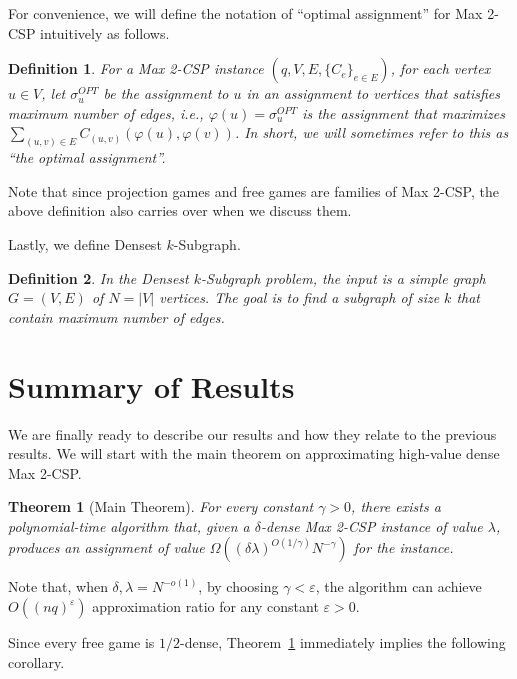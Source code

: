 \documentclass{article}
\newtheorem{theorem}{Theorem}
\newtheorem{definition}{Definition}
\begin{document}
For convenience, we will define the notation of ``optimal assignment'' for {\sc Max 2-CSP} intuitively as follows. \\

\begin{definition}
For a {\sc Max 2-CSP} instance $(q, V, E, \{C_e\}_{e \in E})$, for each vertex $u \in V$, let $\sigma_u^{OPT}$ be the assignment to $u$ in an assignment to vertices that satisfies maximum number of edges, i.e., $\varphi(u) = \sigma_u^{OPT}$ is the assignment that maximizes $\sum_{(u, v) \in E} C_{(u, v)}(\varphi(u), \varphi(v))$. In short, we will sometimes refer to this as ``the optimal assignment''.
\end{definition}

Note that since projection games and free games are families of {\sc Max 2-CSP}, the above definition also carries over when we discuss them.

Lastly, we define {\sc Densest $k$-Subgraph}. \\

\begin{definition}
In the {\sc Densest $k$-Subgraph} problem, the input is a simple graph $G = (V, E)$ of $N = |V|$ vertices. The goal is to find a subgraph of size $k$ that contain maximum number of edges.
\end{definition}

\section{Summary of Results}\label{s:results}

We are finally ready to describe our results and how they relate to the previous results. We will start with the main theorem on approximating high-value dense {\sc Max 2-CSP}. \\

\begin{theorem}[Main Theorem] \label{thm:main}
  For every constant $\gamma > 0$, there exists a polynomial-time algorithm that, given a $\delta$-dense {\sc Max 2-CSP} instance of value $\lambda$, produces an assignment of value $\Omega((\delta \lambda)^{O(1/\gamma)}N^{-\gamma})$ for the instance.
\end{theorem}

Note that, when $\delta, \lambda = N^{-o(1)}$, by choosing $\gamma < \varepsilon$, the algorithm can achieve $O((nq)^\varepsilon)$ approximation ratio for any constant $\varepsilon > 0$.

Since every free game is $1/2$-dense, Theorem~\ref{thm:main} immediately implies the following corollary. \\
\end{document}
